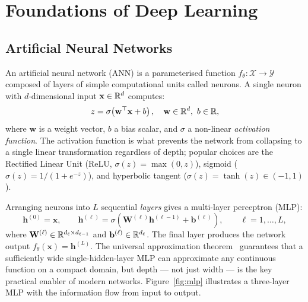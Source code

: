 \section{Foundations of Deep Learning}
\label{sec:deep-learning-foundations}

\subsection{Artificial Neural Networks}

An artificial neural network (ANN) is a parameterised function
$f_\theta : \mathcal{X} \to \mathcal{Y}$ composed of layers of simple
computational units called neurons.
A single neuron with $d$-dimensional input $\mathbf{x} \in \mathbb{R}^d$ computes:
\begin{equation}
  z = \sigma\!\left(\mathbf{w}^\top \mathbf{x} + b\right), \quad
  \mathbf{w} \in \mathbb{R}^d,\ b \in \mathbb{R},
\end{equation}
where $\mathbf{w}$ is a weight vector, $b$ a bias scalar, and $\sigma$ a
non-linear \emph{activation function}.
The activation function is what prevents the network from collapsing to a
single linear transformation regardless of depth; popular choices are the
Rectified Linear Unit (ReLU, $\sigma(z) = \max(0, z)$), sigmoid
($\sigma(z) = 1/(1+e^{-z})$), and hyperbolic tangent
($\sigma(z) = \tanh(z) \in (-1, 1)$).

Arranging neurons into $L$ sequential \emph{layers} gives a multi-layer
perceptron (MLP):
\begin{equation}
  \mathbf{h}^{(0)} = \mathbf{x}, \qquad
  \mathbf{h}^{(\ell)} = \sigma\!\left(\mathbf{W}^{(\ell)} \mathbf{h}^{(\ell-1)}
    + \mathbf{b}^{(\ell)}\right), \qquad \ell = 1, \ldots, L,
\end{equation}
where $\mathbf{W}^{(\ell)} \in \mathbb{R}^{d_\ell \times d_{\ell-1}}$ and
$\mathbf{b}^{(\ell)} \in \mathbb{R}^{d_\ell}$.
The final layer produces the network output $f_\theta(\mathbf{x}) = \mathbf{h}^{(L)}$.
The universal approximation theorem~\cite{cybenko1989approximation,hornik1989multilayer} guarantees
that a sufficiently wide single-hidden-layer MLP can approximate any continuous
function on a compact domain, but depth --- not just width --- is the key
practical enabler of modern networks.
Figure~\ref{fig:mlp} illustrates a three-layer MLP with the information flow
from input to output.

